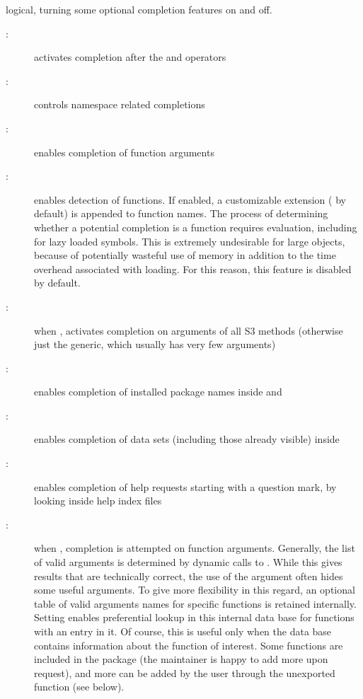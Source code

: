 %
\begin{Arguments}
\begin{ldescription}
\item[\code{ops, ns, args, func, ipck, S3, data, help, argdb, files}] 

logical, turning some optional completion features on and off.

\begin{description}

\item[:] activates completion after the \code{\$} and
 operators

\item[:] controls namespace related completions

\item[:] enables completion of function arguments

\item[:] enables detection of functions.  If enabled,
a customizable extension ( by default) is appended to
function names.  The process of determining whether a potential
completion is a function requires evaluation, including for lazy
loaded symbols.  This is extremely undesirable for large
objects, because of potentially wasteful use of memory in
addition to the time overhead associated with loading.  For this
reason, this feature is disabled by default. 

\item[:]  when , activates completion on
arguments of all S3 methods (otherwise just the generic, which
usually has very few arguments) 

\item[:]  enables completion of installed package names
inside  and  

\item[:]  enables completion of data sets (including
those already visible) inside  

\item[:]  enables completion of help requests starting
with a question mark, by looking inside help index files 

\item[:]  when , completion is
attempted on function arguments.  Generally, the list of valid
arguments is determined by dynamic calls to .
While this gives results that are technically correct, the use
of the  argument often hides some useful arguments.
To give more flexibility in this regard, an optional table of
valid arguments names for specific functions is retained
internally.  Setting  enables preferential
lookup in this internal data base for functions with an entry in
it.  Of course, this is useful only when the data base contains
information about the function of interest.  Some functions are
included in the package (the maintainer is happy to add more
upon request), and more can be added by the user through the
unexported function  (see below).



\end{description}
\end{ldescription}
\end{Arguments}
